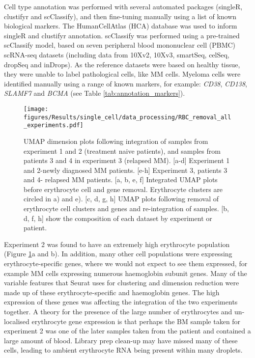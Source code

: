 Cell type annotation was performed with several automated packages (singleR, clustifyr and scClassify), and then fine-tuning manually using a list of known biological markers.
The HumanCellAtlas (HCA) database was used to inform singleR and clustifyr annotation.
scClassify was performed using a pre-trained scClassify model, based on seven peripheral blood mononuclear cell (PBMC) scRNA-seq datasets (including data from 10Xv2, 10Xv3, smartSeq, celSeq, dropSeq and inDrops).
As the reference datasets were based on healthy tissue, they were unable to label pathological cells, like MM cells.
Myeloma cells were identified manually using a range of known markers, for example: \textit{CD38}, \textit{CD138}, \textit{SLAMF7} and \textit{BCMA} (see Table \ref{tab:annotation_markers}).

\begin{figure}[htb]
    \centering
    \texttt{[image: figures/Results/single\_cell/data\_processing/RBC\_removal\_all\_experiments.pdf]}
    \caption[Erythrocyte removal from integrated scRNA-seq datasets]{UMAP dimension plots following integration of samples from experiment 1 and 2 (treatment naive patients), and samples from patients 3 and 4 in experiment 3 (relapsed MM).
    [a-d] Experiment 1 and 2-newly diagnosed MM patients.
    [e-h] Experiment 3, patients 3 and 4- relapsed MM patients.
     [a, b, e, f] Integrated UMAP plots before erythrocyte cell and gene removal. Erythrocyte clusters are circled in a) and e).
     [c, d, g, h] UMAP plots following removal of erythrocyte cell clusters and genes and re-integration of samples.
     [b, d, f, h] show the composition of each dataset by experiment or patient.}
    \label{fig:umap_RBC}
\end{figure}

Experiment 2 was found to have an extremely high erythrocyte population (Figure \ref{fig:umap_RBC}a and b).
In addition, many other cell populations were expressing erythrocyte-specific genes, where we would not expect to see them expressed, for example MM cells expressing numerous haemoglobin subunit genes.
Many of the variable features that Seurat uses for clustering and dimension reduction were made up of these erythrocyte-specific and haemoglobin genes.
The high expression of these genes was affecting the integration of the two experiments together.
A theory for the presence of the large number of erythrocytes and un-localised erythrocyte gene expression is that perhaps the BM sample taken for experiment 2 was one of the later samples taken from the patient and contained a large amount of blood.
Library prep clean-up may have missed many of these cells, leading to ambient erythrocyte RNA being present within many droplets.

